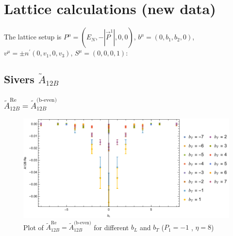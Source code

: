 \documentclass[]{article}
\numberwithin{equation}{section}
\newcommand{\tAmp}{\widetilde{A}}
\newcommand{\tAmp}{\ensuremath{\widetilde{A}^{(+)}}}
\begin{document}
\section{Lattice calculations (new data)}
The lattice setup is $P^{\mu}=(E_N, -|\vec{P}^1|,0,0)$, $b^{\mu}=(0,b_{1},b_{2},0)$, $v^{\mu}=\pm n^{\prime}(0,v_{1},0,v_{3})$, $S^{\mu}=(0,0,0,1)$:
\subsection{Sivers $\tAmp_{12B}$}
\subsubsection{$\tAmp^{\text{Re}}_{12B}=\tAmp^{\text{(b-even)}}_{12B}$}
\begin{figure}[h!]
    \centering
    \includegraphics[width=0.45\linewidth]{bLbT_A12B_b_even_P1_-1_eta_8.pdf}
    \caption{Plot of  $\tAmp^{\text{Re}}_{12B}=\tAmp^{\text{(b-even)}}_{12B}$ for different $b_{L}$ and $b_{T}$  ($P_{1} = -1$ , $\eta=8$)}
\end{figure}
\end{document}
